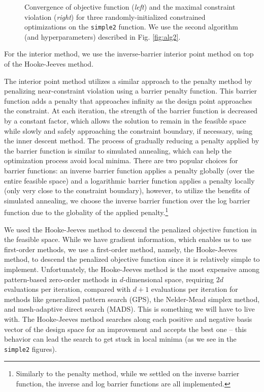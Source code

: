 \documentclass[conference]{IEEEtran}
\begin{document}
\begin{figure*}[htb]
    \centering
     \hspace*{6em}
    
    \caption{Convergence of objective function (\textit{left}) and the maximal constraint violation (\textit{right}) for three randomly-initialized constrained optimizations on the \texttt{simple2} function. We use the second algorithm (and hyperparameters) described in Fig. \ref{fig:alg2}.}
    \label{fig:alg2_conv}
\end{figure*}

For the interior method, we use the inverse-barrier interior point method on top of the Hooke-Jeeves method.

The interior point method utilizes a similar approach to the penalty method by penalizing near-constraint violation using a barrier penalty function. This barrier function adds a penalty that approaches infinity as the design point approaches the constraint. At each iteration, the strength of the barrier function is decreased by a constant factor, which allows the solution to remain in the feasible space while slowly and safely approaching the constraint boundary, if necessary, using the inner descent method. The process of gradually reducing a penalty applied by the barrier function is similar to simulated annealing, which can help the optimization process avoid local minima. There are two popular choices for barrier functions: an inverse barrier function applies a penalty globally (over the entire feasible space) and a logarithmic barrier function applies a penalty locally (only very close to the constraint boundary), however, to utilize the benefits of simulated annealing, we choose the inverse barrier function over the log barrier function due to the globality of the applied penalty.\footnote{Similarly to the penalty method, while we settled on the inverse barrier function, the inverse and log barrier functions are all implemented.}

We used the Hooke-Jeeves method to descend the penalized objective function in the feasible space. While we have gradient information, which enables us to use first-order methods, we use a first-order method, namely, the Hooke-Jeeves method, to descend the penalized objective function since it is relatively simple to implement. Unfortunately, the Hooke-Jeeves method is the most expensive among pattern-based zero-order methods in $d$-dimensional space, requiring $2d$ evaluations per iteration, compared with $d+1$ evaluations per iteration for methods like generalized pattern search (GPS), the Nelder-Mead simplex method, and mesh-adaptive direct search (MADS). This is something we will have to live with. The Hooke-Jeeves method searches along each positive and negative basis vector of the design space for an improvement and accepts the best one -- this behavior can lead the search to get stuck in local minima (as we see in the \texttt{simple2} figures).
\end{document}
